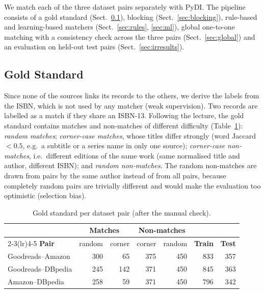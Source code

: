 \documentclass[runningheads]{llncs}
\begin{document}
We match each of the three dataset pairs separately with PyDI. The pipeline
consists of a gold standard (Sect.~\ref{sec:gs}), blocking
(Sect.~\ref{sec:blocking}), rule-based and learning-based matchers
(Sect.~\ref{sec:rules}, \ref{sec:ml}), global one-to-one matching with a
consistency check across the three pairs (Sect.~\ref{sec:global}) and an
evaluation on held-out test pairs (Sect.~\ref{sec:irresults}).

\subsection{Gold Standard}\label{sec:gs}
Since none of the sources links its records to the others, we derive the labels
from the ISBN, which is not used by any matcher (weak supervision). Two records
are labelled as a match if they share an ISBN-13. Following the lecture, the
gold standard contains matches and non-matches of different difficulty
(Table~\ref{tab:gs}): \emph{random matches}; \emph{corner-case matches}, whose
titles differ strongly (word Jaccard $<0.5$, e.g.\ a subtitle or a series name
in only one source); \emph{corner-case non-matches}, i.e.\ different editions of
the same work (same normalised title and author, different ISBN); and
\emph{random non-matches}. The random non-matches are drawn from pairs by the
same author instead of from all pairs, because completely random pairs are
trivially different and would make the evaluation too optimistic (selection
bias).

\begin{table}[htbp]
\centering
\caption{Gold standard per dataset pair (after the manual check).}
\label{tab:gs}
\footnotesize
\begin{tabular}{lrrrrrr}
\toprule
 & \multicolumn{2}{c}{\textbf{Matches}} & \multicolumn{2}{c}{\textbf{Non-matches}} & & \\
\cmidrule(lr){2-3}\cmidrule(lr){4-5}
\textbf{Pair} & random & corner & corner & random & \textbf{Train} & \textbf{Test} \\
\midrule
Goodreads--Amazon  & 300 & 65  & 375 & 450 & 833 & 357 \\
Goodreads--DBpedia & 245 & 142 & 371 & 450 & 845 & 363 \\
Amazon--DBpedia    & 258 & 59  & 371 & 450 & 796 & 342 \\
\bottomrule
\end{tabular}
\end{table}
\end{document}
